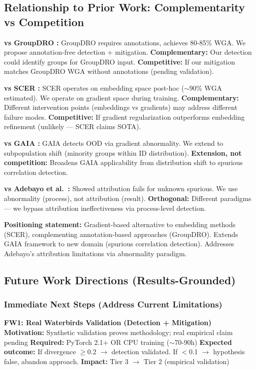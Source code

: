 \subsection{Relationship to Prior Work: Complementarity vs Competition}

\textbf{vs GroupDRO \cite{sagawa2019distributionally}:}
GroupDRO requires annotations, achieves 80-85\% WGA. We propose annotation-free detection + mitigation. \textbf{Complementary:} Our detection could identify groups for GroupDRO input. \textbf{Competitive:} If our mitigation matches GroupDRO WGA without annotations (pending validation).

\textbf{vs SCER \cite{park2025spurious}:}
SCER operates on embedding space post-hoc ($\sim$90\% WGA estimated). We operate on gradient space during training. \textbf{Complementary:} Different intervention points (embeddings vs gradients) may address different failure modes. \textbf{Competitive:} If gradient regularization outperforms embedding refinement (unlikely --- SCER claims SOTA).

\textbf{vs GAIA \cite{chen2023exploring}:}
GAIA detects OOD via gradient abnormality. We extend to subpopulation shift (minority groups within ID distribution). \textbf{Extension, not competition:} Broadens GAIA applicability from distribution shift to spurious correlation detection.

\textbf{vs Adebayo et al.~\cite{adebayo2022post}:}
Showed attribution fails for unknown spurious. We use abnormality (process), not attribution (result). \textbf{Orthogonal:} Different paradigms --- we bypass attribution ineffectiveness via process-level detection.

\textbf{Positioning statement:} Gradient-based alternative to embedding methods (SCER), complementing annotation-based approaches (GroupDRO). Extends GAIA framework to new domain (spurious correlation detection). Addresses Adebayo's attribution limitations via abnormality paradigm.

\subsection{Future Work Directions (Results-Grounded)}

\subsubsection{Immediate Next Steps (Address Current Limitations)}

\textbf{FW1: Real Waterbirds Validation (Detection + Mitigation)}
\textbf{Motivation:} Synthetic validation proves methodology; real empirical claim pending
\textbf{Required:} PyTorch 2.1+ OR CPU training ($\sim$70-90h)
\textbf{Expected outcome:} If divergence $\geq$0.2 $\rightarrow$ detection validated. If $<$0.1 $\rightarrow$ hypothesis false, abandon approach.
\textbf{Impact:} Tier 3 $\rightarrow$ Tier 2 (empirical validation)

